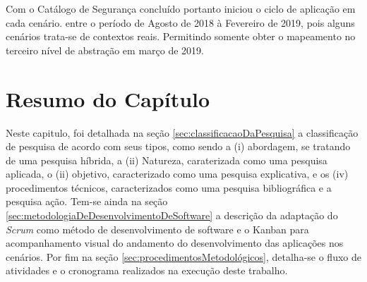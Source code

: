 Com o Catálogo de Segurança concluído portanto iniciou o ciclo de aplicação em cada cenário. entre o período de Agosto de 2018 à Fevereiro de 2019, pois alguns cenários trata-se de contextos reais. Permitindo somente obter o mapeamento no terceiro nível de abstração em março de 2019.

\section{Resumo do Capítulo}

Neste capitulo, foi detalhada na seção \ref{sec:classificacaoDaPesquisa} a classificação de pesquisa de acordo com seus tipos, como sendo a (i) abordagem, se tratando de uma pesquisa híbrida, a (ii) Natureza, caraterizada como uma pesquisa aplicada, o (ii) objetivo, caracterizado como uma pesquisa explicativa, e os (iv) procedimentos técnicos, caracterizados como uma pesquisa bibliográfica e a pesquisa ação. Tem-se ainda na seção \ref{sec:metodologiaDeDesenvolvimentoDeSoftware} a descrição da adaptação do \textit{Scrum} como método de desenvolvimento de software e o Kanban para acompanhamento visual do andamento do desenvolvimento das aplicações nos cenários. Por fim na seção \ref{sec:procedimentosMetodológicos}, detalha-se o fluxo de atividades e o cronograma realizados na execução deste trabalho.

